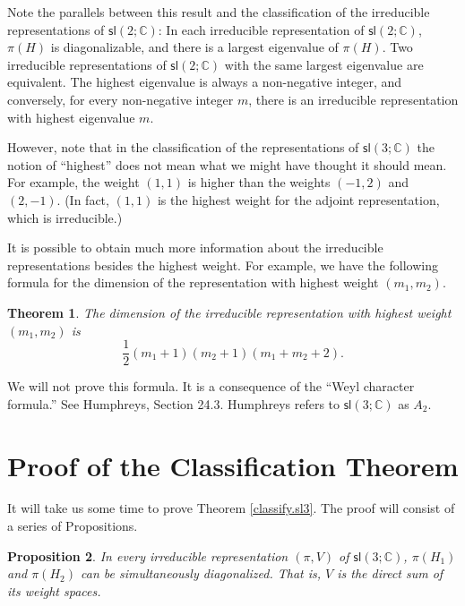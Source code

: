 \documentclass[12pt]{amsbook}
\theoremstyle{plain}
\newtheorem{theorem}{Theorem}
\newtheorem{proposition}[theorem]{Proposition}
\numberwithin{equation}{chapter}
\numberwithin{theorem}{chapter}
\begin{document}
Note the parallels between this result and the classification of the
irreducible representations of $\mathsf{sl}(2;\mathbb{C})$: In each
irreducible representation of $\mathsf{sl}(2;\mathbb{C})$, $\pi(H)$ is
diagonalizable, and there is a largest eigenvalue of $\pi(H)$. Two irreducible
representations of $\mathsf{sl}(2;\mathbb{C})$ with the same largest
eigenvalue are equivalent. The highest eigenvalue is always a non-negative
integer, and conversely, for every non-negative integer $m$, there is an
irreducible representation with highest eigenvalue $m$.

However, note that in the classification of the representations of
$\mathsf{sl}\left(  3;\mathbb{C}\right)  $ the notion of ``highest'' does not
mean what we might have thought it should mean. For example, the weight
$(1,1)$ is higher than the weights $(-1,2)$ and $(2,-1)$. (In fact, $(1,1)$ is
the highest weight for the adjoint representation, which is irreducible.)

It is possible to obtain much more information about the irreducible
representations besides the highest weight. For example, we have the following
formula for the dimension of the representation with highest weight
$(m_{1},m_{2})$.

\begin{theorem}
The dimension of the irreducible representation with highest weight
$(m_{1},m_{2})$ is
\[
\frac{1}{2}(m_{1}+1)(m_{2}+1)(m_{1}+m_{2}+2)\text{.}%
\]
\end{theorem}

We will not prove this formula. It is a consequence of the ``Weyl character
formula.'' See Humphreys, Section 24.3. Humphreys refers to $\mathsf{sl}%
\left(  3;\mathbb{C}\right)  $ as $A_{2}$.

\section{Proof of the Classification Theorem}

It will take us some time to prove Theorem \ref{classify.sl3}. The proof will
consist of a series of Propositions.

\begin{proposition}
\label{sl3.weights}In every irreducible representation $\left(  \pi,V\right)
$ of $\mathsf{sl}\left(  3;\mathbb{C}\right)  $, $\pi(H_{1})$ and $\pi(H_{2})$
can be simultaneously diagonalized. That is, $V$ is the direct sum of its
weight spaces.
\end{proposition}
\end{document}

